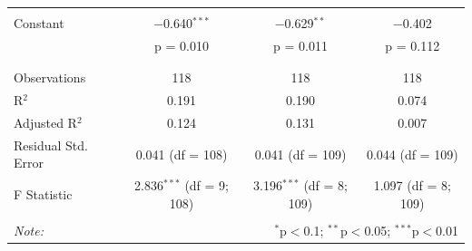 \begin{table}[!htbp]
\begin{tabular}{@{\extracolsep{5pt}}lccc}
  & & & \\ 
 Constant & $-$0.640$^{***}$ & $-$0.629$^{**}$ & $-$0.402 \\ 
  & p = 0.010 & p = 0.011 & p = 0.112 \\ 
  & & & \\ 
\hline \\[-1.8ex] 
Observations & 118 & 118 & 118 \\ 
R$^{2}$ & 0.191 & 0.190 & 0.074 \\ 
Adjusted R$^{2}$ & 0.124 & 0.131 & 0.007 \\ 
Residual Std. Error & 0.041 (df = 108) & 0.041 (df = 109) & 0.044 (df = 109) \\ 
F Statistic & 2.836$^{***}$ (df = 9; 108) & 3.196$^{***}$ (df = 8; 109) & 1.097 (df = 8; 109) \\ 
\hline 
\hline \\[-1.8ex] 
\textit{Note:}  & \multicolumn{3}{r}{$^{*}$p$<$0.1; $^{**}$p$<$0.05; $^{***}$p$<$0.01} \\ 
\end{tabular} 
\end{table}




